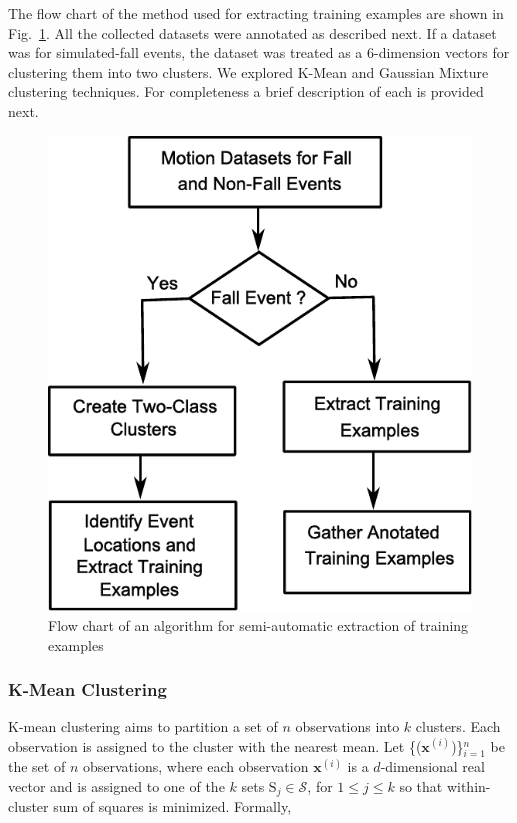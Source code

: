 \documentclass[]{IEEEtran}
\begin{document}
The flow chart of the method used for extracting training examples are shown in Fig.~\ref{fig:FlowChartforAlgorTrainingExamples}. All the collected datasets were annotated as described next. If a dataset was for simulated-fall events, the dataset was treated as a 6-dimension vectors for clustering them into two clusters. We explored K-Mean and Gaussian Mixture clustering techniques. For completeness a brief description of each is provided next.

\begin{figure}[htb]
	\centering
		\includegraphics[width = 0.65\columnwidth]{figures/FlowChartAlgoForTrainingExamples.pdf}
	\caption{Flow chart of an algorithm for semi-automatic extraction of training 
	examples}
	\label{fig:FlowChartforAlgorTrainingExamples}
\end{figure}

\subsubsection{K-Mean Clustering\cite{Bishop:2006:PRM:1162264}}
K-mean clustering aims to partition a set of $n$ observations into $k$ clusters. Each 
observation is assigned to the cluster with the nearest mean. Let 
\{($\mathbf{x}^{(i)}$)\}$_{i=1}^n$  be the set of $n$ 
observations, where each observation $\mathbf{x}^{(i)}$ is a $d$-dimensional real vector 
and is 
assigned to one of the $k$ sets $\mathrm{S}_j \in \mathcal{S}$, for $ 1 \leq  j \leq k$ so 
that 
within-cluster 
sum of squares is minimized. Formally,
\end{document}
